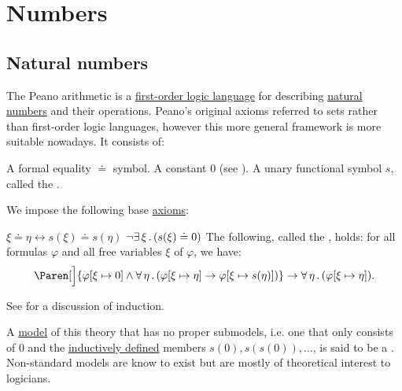 \section{Numbers}\label{sec:numbers}
\subsection{Natural numbers}\label{subsec:natural_numbers}

\begin{definition}\label{def:peano_arithmetic}
  The Peano arithmetic is a \hyperref[def:first_order_language]{first-order logic language} for describing \hyperref[def:natural_numbers]{natural numbers} and their operations. Peano's original axioms referred to sets rather than first-order logic languages, however this more general framework is more suitable nowadays. It consists of:
  \begin{DefEnum}
     A formal equality \( \doteq \) symbol.
     A  constant \( 0 \) (see ).
     A unary functional symbol \( s \), called the .
  \end{DefEnum}

  We impose the following base \hyperref[def:first_order_theory]{axioms}:
  \begin{DefEnum}
     \( \xi \doteq \eta \leftrightarrow s(\xi) \doteq s(\eta) \)
     \( \neg \exists \, \xi \, . \, (s(\xi) \doteq 0) \)
     The following, called the , holds: for all formulas \( \varphi \) and all free variables \( \xi \) of \( \varphi \), we have:
    \begin{equation*}
      \Paren[\Big]{ \varphi[\xi \mapsto 0] \wedge \ForAll{\eta} (\varphi[\xi \mapsto \eta] \to \varphi[\xi \mapsto s(\eta)]) } \to \ForAll{\eta} (\varphi[\xi \mapsto \eta]).
    \end{equation*}

    See  for a discussion of induction.
  \end{DefEnum}

  A \hyperref[def:first_order_semantics/satisfiability]{model} of this theory that has no proper submodels, i.e. one that only consists of \( 0 \) and the \hyperref[rem:induction]{inductively defined} members \( s(0), s(s(0)), \ldots \), is said to be a . Non-standard models are know to exist but are mostly of theoretical interest to logicians.


\end{definition}
